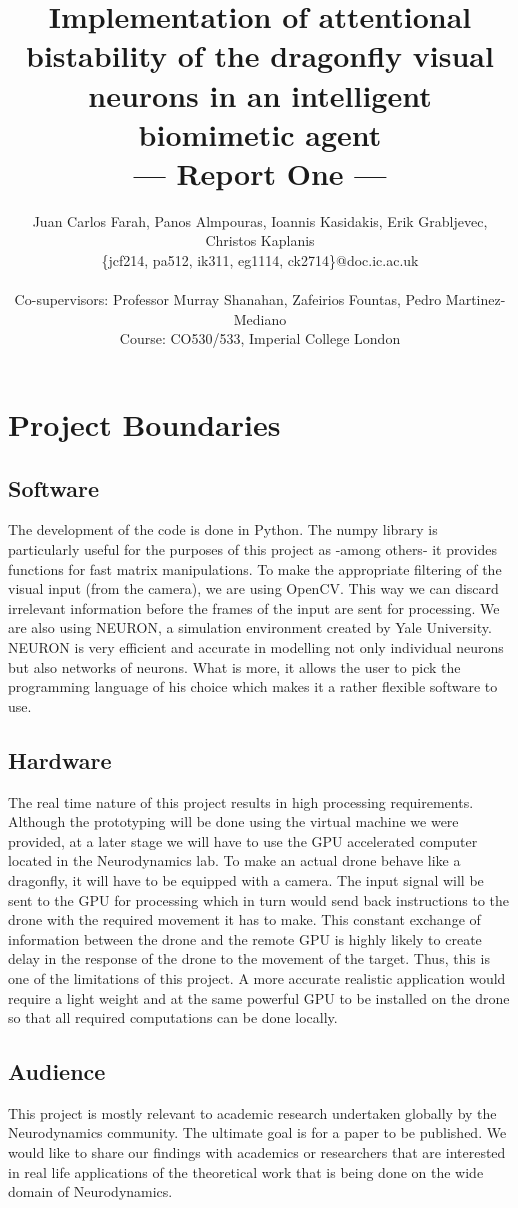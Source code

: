 \documentclass[a4paper,11pt]{article}
\title{Implementation of attentional bistability of the dragonfly visual neurons in an intelligent biomimetic agent\\\Large{--- Report One ---}}
\author{Juan Carlos Farah, Panos Almpouras, Ioannis Kasidakis, Erik Grabljevec, Christos Kaplanis\\
       \{jcf214, pa512, ik311, eg1114, ck2714\}@doc.ic.ac.uk\\ \\
       \small{Co-supervisors: Professor Murray Shanahan, Zafeirios Fountas, Pedro Martinez-Mediano}\\
       \small{Course: CO530/533, Imperial College London}
}
\begin{document}
\maketitle

\section{Project Boundaries}

\subsection{Software}
The development of the code is done in Python. The numpy library is particularly useful for the purposes of this project as -among others- it provides functions for fast matrix manipulations.
To make the appropriate filtering of the visual input (from the camera), we are using OpenCV. This way we can discard irrelevant information before the frames of the input are sent for processing.
We are also using NEURON, a simulation environment created by Yale University. NEURON is very efficient and accurate in modelling not only individual neurons but also networks of neurons. What is more, it allows the user to pick the programming language of his choice which makes it a rather flexible software to use.

\subsection{Hardware}
The real time nature of this project results in high processing requirements. Although the prototyping will be done using the virtual machine we were provided, at a later stage we will have to use the GPU accelerated computer located in the Neurodynamics lab.
To make an actual drone behave like a dragonfly, it will have to be equipped with a camera. The input signal will be sent to the GPU for processing which in turn would send back instructions to the drone with the required movement it has to make. This constant exchange of information between the drone and the remote GPU is highly likely to create delay in the response of the drone to the movement of the target. Thus, this is one of the limitations of this project. A more accurate realistic application would require a light weight and at the same powerful GPU to be installed on the drone so that all required computations can be done locally. 

\subsection{Audience}
This project is mostly relevant to academic research undertaken globally by the Neurodynamics community. The ultimate goal is for a paper to be published. We would like to share our findings with academics or researchers that are interested in real life applications of the theoretical work that is being done on the wide domain of Neurodynamics.
\end{document}
